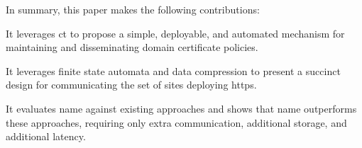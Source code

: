 
In summary, this paper makes the following contributions:
\begin{compactitem}
\item It leverages \ac{ct} to propose a simple, deployable, and automated
  mechanism for maintaining and disseminating domain certificate policies.
\item It leverages finite state automata and data compression to present  a
  succinct design for communicating the set of sites deploying \ac{https}.
\item It evaluates \ac{name} against existing approaches and shows that
  \ac{name} outperforms these approaches, requiring only \steve{} extra
  communication, \steve{} additional storage, and \steve{} additional latency.
\end{compactitem}





